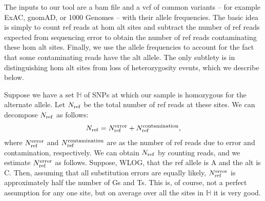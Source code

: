 \documentclass[nofootinbib,amssymb,amsmath]{revtex4}
\begin{document}
The inputs to our tool are a bam file and a vcf of common variants -- for example ExAC, gnomAD, or 1000 Genomes -- with their allele frequencies.  The basic idea is simply to count ref reads at hom alt sites and subtract the number of ref reads expected from sequencing error to obtain the number of ref reads contaminating these hom alt sites.  Finally, we use the allele frequencies to account for the fact that some contaminating reads have the alt allele.  The only subtlety is in distinguishing hom alt sites from loss of heterozygosity events, which we describe below.

Suppose we have a set $\mathbb{H}$ of SNPs at which our sample is homozygous for the alternate allele.  Let $N_{\rm ref}$ be the total number of ref reads at these sites.  We can decompose $N_{\rm ref}$ as follows:
\begin{align}
N_{\rm ref} = N_{\rm ref}^{\rm error} + N_{\rm ref}^{\rm contamination}, \label{decomposition}
\end{align}
where $N_{\rm ref}^{\rm error}$  and $N_{\rm ref}^{\rm contamination}$ are as the number of ref reads due to error and contamination, respectively.  We can obtain $N_{\rm ref}$ by counting reads, and we estimate $N_{\rm ref}^{\rm error}$ as follows.  Suppose, WLOG, that the ref allele is A and the alt is C.  Then, assuming that all substitution errors are equally likely, $N_{\rm ref}^{\rm error}$ is approximately half the number of Gs and Ts.  This is, of course, not a perfect assumption for any one site, but on average over all the sites in $\mathbb{H}$ it is very good.
\end{document}
